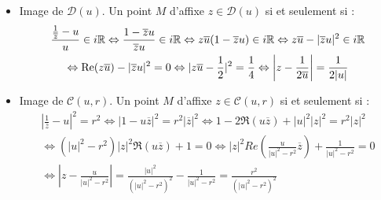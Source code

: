 \begin{enumerate}
\begin{itemize}
 \item Image de $\mathcal D(u)$. Un point $M$ d'affixe $z\in\mathcal D(u)$ si et seulement si :
\begin{multline*}
  \frac{\frac{1}{\overline{z}}-u}{u}\in i\mathbb{R} \Leftrightarrow \frac{1-\overline{z}u}{\overline{z}u}\in i\mathbb{R} \Leftrightarrow
z\overline{u}(1-\overline{z}u) \in i\mathbb{R} \Leftrightarrow z\overline{u} - |\overline{z}u|^2\in i\mathbb{R} \\ 
\Leftrightarrow \operatorname{Re}(z\overline{u}) - |\overline{z}u|^2 =0 \Leftrightarrow |z\overline{u} -\frac{1}{2}|^2=\frac{1}{4}
\Leftrightarrow\left\vert z-\frac{1}{2\overline{u}}\right\vert=\frac{1}{2|u|} 
\end{multline*}

\item Image de $\mathcal C(u,r)$. Un point $M$ d'affixe $z\in\mathcal C(u,r)$ si et seulement si :
\begin{multline*}
 \left\vert \frac{1}{\overline{z}}-u\right\vert^2 = r^2 
\Leftrightarrow \left\vert 1-u\overline{z}\right\vert^2 = r^2|\overline{z}|^2
\Leftrightarrow 1 -2 \Re(u\overline{z}) + |u|^2|z|^2=r^2 |z|^2 \\
\Leftrightarrow (|u|^2-r^2)|z|^2\Re(u\overline{z}) +1 = 0
\Leftrightarrow |z|^2Re\left( \frac{u}{|u|^2-r^2}\overline{z}\right)+ \frac{1}{|u|^2-r^2} = 0 \\
\Leftrightarrow \left \vert z - \frac{u}{|u|^2-r^2}\right\vert = \frac{|u|^2}{(|u|^2-r^2)^2}-\frac{1}{|u|^2-r^2}=\frac{r^2}{(|u|^2-r^2)^2}
\end{multline*}
\end{itemize}
\end{enumerate}

